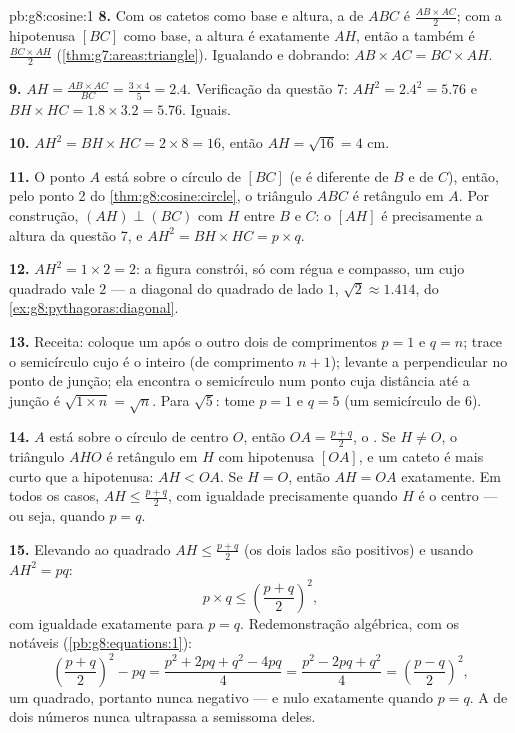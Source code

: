 \begin{solution}{pb:g8:cosine:1}
\textbf{8.} Com os catetos como base e altura, a  de $ABC$ é
$\frac{AB \times AC}{2}$; com a hipotenusa $[BC]$ como base, a altura é
exatamente $AH$, então a  também é $\frac{BC \times AH}{2}$
(\cref{thm:g7:areas:triangle}). Igualando e dobrando:
$AB \times AC = BC \times AH$.

\textbf{9.} $AH = \frac{AB \times AC}{BC} = \frac{3 \times 4}{5} =
2.4$. Verificação da questão 7: $AH^2 = 2.4^2 = 5.76$ e
$BH \times HC = 1.8 \times 3.2 = 5.76$. Iguais.

\textbf{10.} $AH^2 = BH \times HC = 2 \times 8 = 16$, então
$AH = \sqrt{16} = 4$ cm.

\textbf{11.} O ponto $A$ está sobre o círculo de  $[BC]$ (e é
diferente de $B$ e de $C$), então, pelo ponto 2 do
\cref{thm:g8:cosine:circle}, o triângulo $ABC$ é retângulo em $A$. Por
construção, $(AH) \perp (BC)$ com $H$ entre $B$ e $C$: o 
$[AH]$ é precisamente a altura da questão 7, e
$AH^2 = BH \times HC = p \times q$.

\textbf{12.} $AH^2 = 1 \times 2 = 2$: a figura constrói, só com régua e
compasso, um  cujo quadrado vale $2$ --- a diagonal do quadrado
de lado $1$, $\sqrt2 \approx 1.414$, do
\cref{ex:g8:pythagoras:diagonal}.

\textbf{13.} Receita: coloque um após o outro dois  de
comprimentos $p = 1$ e $q = n$; trace o semicírculo cujo  é o
 inteiro (de comprimento $n + 1$); levante a perpendicular no
ponto de junção; ela encontra o semicírculo num ponto cuja distância
até a junção é $\sqrt{1 \times n} = \sqrt n$. Para $\sqrt5$: tome
$p = 1$ e $q = 5$ (um semicírculo de  $6$).

\textbf{14.} $A$ está sobre o círculo de centro $O$, então
$OA = \frac{p+q}{2}$, o . Se $H \neq O$, o triângulo $AHO$ é
retângulo em $H$ com hipotenusa $[OA]$, e um cateto é mais curto que a
hipotenusa: $AH < OA$. Se $H = O$, então $AH = OA$ exatamente. Em todos
os casos, $AH \leq \frac{p+q}{2}$, com igualdade precisamente quando
$H$ é o centro --- ou seja, quando $p = q$.

\textbf{15.} Elevando ao quadrado $AH \leq \frac{p+q}{2}$ (os dois
lados são positivos) e usando $AH^2 = pq$:
\[
p \times q \leq \left(\frac{p+q}{2}\right)^2 ,
\]
com igualdade exatamente para $p = q$. Redemonstração algébrica, com os
 notáveis (\cref{pb:g8:equations:1}):
\[
\left(\frac{p+q}{2}\right)^2 - pq
= \frac{p^2 + 2pq + q^2 - 4pq}{4}
= \frac{p^2 - 2pq + q^2}{4}
= \left(\frac{p-q}{2}\right)^2 ,
\]
um quadrado, portanto nunca negativo --- e nulo exatamente quando
$p = q$. A  de dois números nunca ultrapassa a
semissoma deles.
\end{solution}
